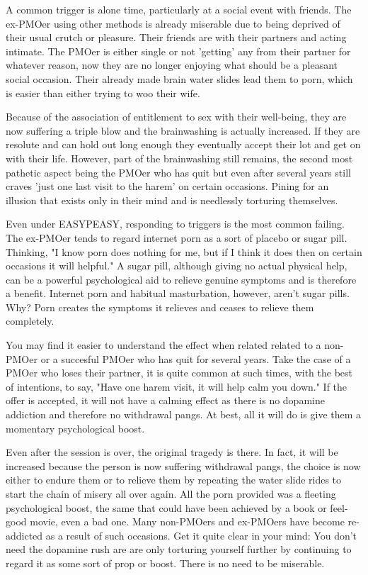 A common trigger is alone time, particularly at a social event with friends. The ex-PMOer using other methods is already miserable due to being deprived of their usual crutch or pleasure. Their friends are with their partners and acting intimate. The PMOer is either single or not 'getting' any from their partner for whatever reason, now they are no longer enjoying what should be a pleasant social occasion. Their already made brain water slides lead them to porn, which is easier than either trying to woo their wife.

Because of the association of entitlement to sex with their well-being, they are now suffering a triple blow and the brainwashing is actually increased. If they are resolute and can hold out long enough they eventually accept their lot and get on with their life. However, part of the brainwashing still remains, the second most pathetic aspect being the PMOer who has quit but even after several years still craves 'just one last visit to the harem' on certain occasions. Pining for an illusion that exists only in their mind and is needlessly torturing themselves.

Even under EASYPEASY, responding to triggers is the most common failing. The ex-PMOer tends to regard internet porn as a sort of placebo or sugar pill. Thinking, "I know porn does nothing for me, but if I think it does then on certain occasions it will helpful." A sugar pill, although giving no actual physical help, can be a powerful psychological aid to relieve genuine symptoms and is therefore a benefit. Internet porn and habitual masturbation, however, aren't sugar pills. Why? Porn creates the symptoms it relieves and ceases to relieve them completely.

You may find it easier to understand the effect when related related to a non-PMOer or a succesful PMOer who has quit for several years. Take the case of a PMOer who loses their partner, it is quite common at such times, with the best of intentions, to say, "Have one harem visit, it will help calm you down." If the offer is accepted, it will not have a calming effect as there is no dopamine addiction and therefore no withdrawal pangs. At best, all it will do is give them a momentary psychological boost.

Even after the session is over, the original tragedy is there. In fact, it will be increased because the person is now suffering withdrawal pangs, the choice is now either to endure them or to relieve them by repeating the water slide rides to start the chain of misery all over again. All the porn provided was a fleeting psychological boost, the same that could have been achieved by a book or feel-good movie, even a bad one. Many non-PMOers and ex-PMOers have become re-addicted as a result of such occasions. Get it quite clear in your mind: You don't need the dopamine rush are are only torturing yourself further by continuing to regard it as some sort of prop or boost. There is no need to be miserable.


